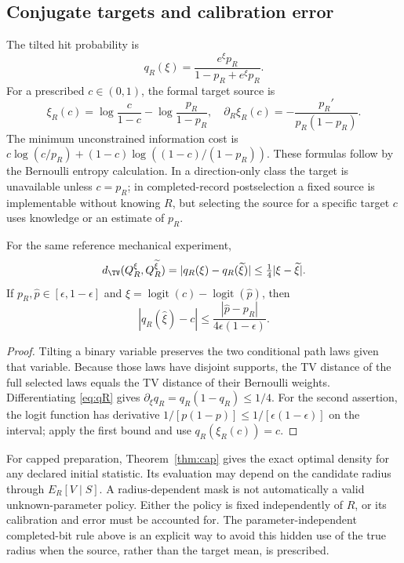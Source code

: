 \subsection{Conjugate targets and calibration error}
The tilted hit probability is
\begin{equation}
 q_R(\xi)=\frac{e^\xi p_R}{1-p_R+e^\xi p_R}.
 \label{eq:qR}
\end{equation}
For a prescribed $c\in(0,1)$, the formal target source is
\[
 \xi_R(c)=\log\frac c{1-c}-\log\frac{p_R}{1-p_R},\quad
 \partial_R\xi_R(c)=-\frac{p_R'}{p_R(1-p_R)}.
\]
The minimum unconstrained information cost is
$c\log(c/p_R)+(1-c)\log((1-c)/(1-p_R))$.
These formulas follow by the Bernoulli entropy calculation. In a direction-only class the target is unavailable unless $c=p_R$; in completed-record postselection a fixed source is implementable without knowing $R$, but selecting the source for a specific target $c$ uses knowledge or an estimate of $p_R$.

\begin{proposition}\label{prop:calibration-error}
For the same reference mechanical experiment,
\[
 d_{\TV}(Q_R^\xi,Q_R^{\widetilde\xi})
 =|q_R(\xi)-q_R(\widetilde\xi)|\le\tfrac14|\xi-\widetilde\xi|.
\]
If $p_R,\widehat p\in[\epsilon,1-\epsilon]$ and
$\widehat\xi=\operatorname{logit}(c)-\operatorname{logit}(\widehat p)$, then
\[
 |q_R(\widehat\xi)-c|
 \le\frac{|\widehat p-p_R|}{4\epsilon(1-\epsilon)}.
\]
\end{proposition}
\begin{proof}
Tilting a binary variable preserves the two conditional path laws given that variable. Because those laws have disjoint supports, the TV distance of the full selected laws equals the TV distance of their Bernoulli weights. Differentiating \eqref{eq:qR} gives $\partial_\xi q_R=q_R(1-q_R)\le1/4$. For the second assertion, the logit function has derivative $1/[p(1-p)]\le1/[\epsilon(1-\epsilon)]$ on the interval; apply the first bound and use $q_R(\xi_R(c))=c$.
\end{proof}

For capped preparation, Theorem~\ref{thm:cap} gives the exact optimal density for any declared initial statistic. Its evaluation may depend on the candidate radius through $E_R[V\mid S]$. A radius-dependent mask is not automatically a valid unknown-parameter policy. Either the policy is fixed independently of $R$, or its calibration and error must be accounted for. The parameter-independent completed-bit rule above is an explicit way to avoid this hidden use of the true radius when the source, rather than the target mean, is prescribed.

